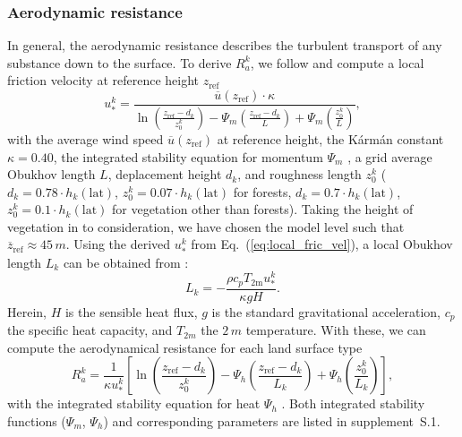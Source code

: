 \documentclass[gmd, manuscript]{copernicus}
\begin{document}
\subsubsection{Aerodynamic resistance}
\label{subsubsec:Ra}
In general, the aerodynamic resistance describes the turbulent transport of any substance down to the surface. To derive $R_a^k$, we follow \citet{WASP:Simpson2003,ACP:Simpson2012} and compute a local friction velocity at reference height $z_\mathrm{ref}$ \citep[Eq.~(52),][]{ACP:Simpson2012}
\begin{equation}
  u_*^k = \frac{\overline{u}(z_\mathrm{ref})\cdot\kappa}{\ln{(\frac{z_\mathrm{ref}-d_k}{z_0^k})}-\Psi_m(\frac{z_\mathrm{ref}-d_k}{L})+\Psi_m(\frac{z_0^k}{L})},
  \label{eq:local_fric_vel}
\end{equation}
with the average wind speed $\overline{u}(z_\mathrm{ref})$ at reference height, the K\'{a}rm\'{a}n constant $\kappa = 0.40$, the integrated stability equation for momentum $\Psi_m$ \citep[e.g.,][]{Garratt1992}, a grid average Obukhov length $L$, deplacement height $d_k$, and roughness length $z_0^k$ ($d_k=0.78\cdot h_k(\mathrm{lat})$, $z_0^k=0.07\cdot h_k(\mathrm{lat})$ for forests, $d_k=0.7\cdot h_k(\mathrm{lat})$, $z_0^k=0.1\cdot h_k(\mathrm{lat})$ for vegetation other than forests). Taking the height of vegetation in to consideration, we have chosen the model level such that $\overline{z}_\mathrm{ref}\approx 45\,\unit{m}$. Using the derived $u_*^k$ from Eq.~(\ref{eq:local_fric_vel}), a local Obukhov length $L_k$ can be obtained from \citep[Eq.~(8),][]{ACP:Simpson2012}:
\begin{equation}
  L_k = - \frac{\rho c_p T_\mathrm{2m} u_*^k}{\kappa g H}.
\end{equation}
Herein, $H$ is the sensible heat flux, $g$ is the standard gravitational acceleration, $c_p$ the specific heat capacity, and $T_{2m}$ the $2\,\unit{m}$ temperature. With these, we can compute the aerodynamical resistance for each land surface type \citep[Eq.~(8.8),][]{WASP:Simpson2003}
\begin{equation}
  R_a^k = \frac{1}{\kappa u_*^k}\left[{\ln{\left(\frac{z_\mathrm{ref}-d_k}{z_0^k}\right)}-\Psi_h\left(\frac{z_\mathrm{ref}-d_k}{L_k}\right)+\Psi_h\left(\frac{z_0^k}{L_k}\right)}\right],
\end{equation}
with the integrated stability equation for heat $\Psi_h$ \citep[e.g.,][]{Garratt1992}. Both integrated stability functions ($\Psi_m$, $\Psi_h$) and corresponding parameters are listed in supplement~S.1.
\end{document}
